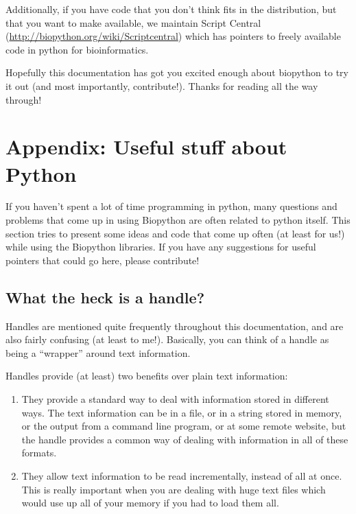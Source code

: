 \documentclass{report}
\begin{document}
Additionally, if you have code that you don't think fits in the
distribution, but that you want to make available, we maintain Script
Central (\url{http://biopython.org/wiki/Scriptcentral})
which has pointers to freely available code in python for bioinformatics.

Hopefully this documentation has got you excited enough about
biopython to try it out (and most importantly, contribute!). Thanks
for reading all the way through!

\chapter{Appendix: Useful stuff about Python}
\label{sec:appendix}

If you haven't spent a lot of time programming in python, many
questions and problems that come up in using Biopython are often
related to python itself. This section tries to present some ideas and
code that come up often (at least for us!) while using the Biopython
libraries. If you have any suggestions for useful pointers that could
go here, please contribute!

\section{What the heck is a handle?}
\label{sec:appendix-handles}

Handles are mentioned quite frequently throughout this documentation,
and are also fairly confusing (at least to me!). Basically, you can
think of a handle as being a ``wrapper'' around text information.

Handles provide (at least) two benefits over plain text information:

\begin{enumerate}
  \item They provide a standard way to deal with information stored in
  different ways. The text information can be in a file, or in a
  string stored in memory, or the output from a command line program,
  or at some remote website, but the handle provides a common way of
  dealing with information in all of these formats.

  \item They allow text information to be read incrementally, instead
  of all at once. This is really important when you are dealing with
  huge text files which would use up all of your memory if you had to
  load them all.
\end{enumerate}
\end{document}
